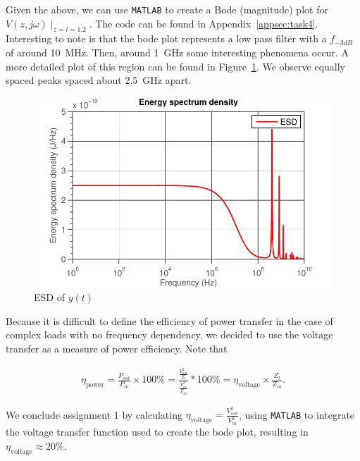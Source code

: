 \documentclass[11pt,titlepage]{report}
\begin{document}
Given the above, we can use \texttt{MATLAB} to create a Bode (magnitude) plot for $V(z,j\omega)\mid_{z=l=1.2}$. The code can be found in Appendix~\ref{appsec:task4}.
Interesting to note is that the bode plot represents a low pass filter with a $f_{-3dB}$ of around \SI{10}{\mega\hertz}. Then, around \SI{1}{\giga\hertz} some interesting phenomena occur. A more detailed plot of this region can be found in Figure~\ref{fig:ass1-esd}. We observe equally spaced peaks spaced about \SI{2.5}{\giga\hertz} apart.

\begin{figure}[H]
	\centering
	\includegraphics[width=.85\linewidth]{resource/esd.pdf}
	\caption{ESD of $y(t)$}
	\label{fig:ass1-esd}
\end{figure}

Because it is difficult to define the efficiency of power transfer in the case of complex loads with no frequency dependency, we decided to use the voltage transfer as a measure of power efficiency. Note that

\begin{align}
	\eta_{\text{power}}=\frac{P_{out}}{P_{in}} \times 100\% = 
	\frac{\frac{V_{out}^2}{Z_l}}{\frac{V_{in}^2}{Z_{in}}}*100\% =
	\eta_{\text{voltage}} \times \frac{Z_l}{Z_{in}}.
\end{align}

We conclude assignment 1 by calculating $\eta_{\text{voltage}}=\frac{V_{out}^2}{V_{in}^2}$, using \texttt{MATLAB} to integrate the voltage transfer function used to create the bode plot, resulting in $\eta_{\text{voltage}}\approx 20\%$.
\end{document}
